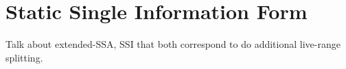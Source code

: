 \chapter{Static Single Information Form }

Talk about extended-SSA, SSI that both correspond to do additional live-range splitting.
